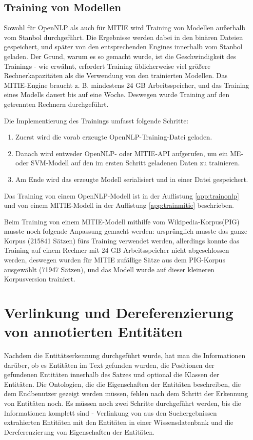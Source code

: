 \subsection{Training von Modellen} \label{subsec:TRMODELLS}
Sowohl für OpenNLP als auch für MITIE wird Training von Modellen außerhalb vom Stanbol durchgeführt. Die Ergebnisse werden dabei in den binären Dateien gespeichert, und später von den entsprechenden Engines innerhalb vom Stanbol geladen. Der Grund, warum es so gemacht wurde, ist die Geschwindigkeit des Trainings - wie erwähnt, erfordert Training üblicherweise viel größere Rechnerkapazitäten als die Verwendung von den trainierten Modellen. Das MITIE-Engine braucht z. B. mindestens 24 GB Arbeitsspeicher, und das Training eines Modells dauert bis auf eine Woche. Deswegen wurde Training auf den getrennten Rechnern durchgeführt.

Die Implementierung des Trainings umfasst folgende Schritte: 
\begin{enumerate}
\item Zuerst wird die vorab erzeugte OpenNLP-Training-Datei geladen.
\item Danach wird entweder OpenNLP- oder MITIE-API aufgerufen, um ein ME- oder SVM-Modell auf den im ersten Schritt geladenen Daten zu trainieren.
\item Am Ende wird das erzeugte Modell serialisiert und in einer Datei gespeichert.
\end{enumerate}
Das Training von einem OpenNLP-Modell ist in der Auflistung \ref{app:trainonlp} und von einem MITIE-Modell in der Auflistung \ref{app:trainmitie} beschrieben.

Beim Training von einem MITIE-Modell mithilfe vom Wikipedia-Korpus(PIG) musste noch folgende Anpassung gemacht werden: ursprünglich musste das ganze Korpus (215841 Sätzen) fürs Training verwendet werden, allerdings konnte das Training auf einem Rechner mit 24 GB Arbeitsspeicher nicht abgeschlossen werden, deswegen wurden für MITIE zufällige Sätze aus dem PIG-Korpus ausgewählt (71947 Sätzen), und das Modell wurde auf dieser kleineren Korpusversion trainiert.

\section{Verlinkung und Dereferenzierung von annotierten Entitäten} \label{sec:VERLINKUNGSEC}
\paragraph{}
Nachdem die Entitätserkennung durchgeführt wurde, hat man die Informationen darüber, ob es Entitäten im Text gefunden wurden, die Positionen der gefundenen Entitäten innerhalb des Satzes und optional die Klassen der Entitäten. Die Ontologien, die die Eigenschaften der Entitäten beschreiben, die dem Endbenutzer gezeigt werden müssen, fehlen nach dem Schritt der Erkennung von Entitäten noch. Es müssen noch zwei Schritte durchgeführt werden, bis die Informationen komplett sind - Verlinkung von aus den Suchergebnissen extrahierten Entitäten mit den Entitäten in einer Wissensdatenbank und die Dereferenzierung von Eigenschaften der Entitäten.

